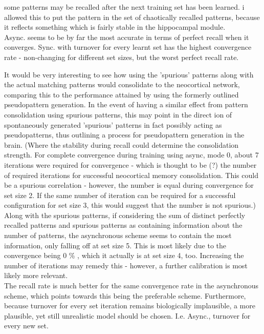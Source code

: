 some patterns may be recalled after the next training set has been learned. i allowed this to put the pattern in the set of chaotically recalled patterns, because it reflects something which is fairly stable in the hippocampal module.
\\

Async. seems to be by far the most accurate in terms of perfect recall when it converges. Sync. with turnover for every learnt set has the highest convergence rate - non-changing for different set sizes, but the worst perfect recall rate.

It would be very interesting to see how using the 'spurious' patterns along with the actual matching patterns would consolidate to the neocortical network, comparing this to the performance attained by using the formerly outlined pseudopattern generation. In the event of having a similar effect from pattern consolidation using spurious patterns, this may point in the direct
ion of spontaneously generated 'spurious' patterns in fact possibly acting as pseudopatterns, thus outlining a process for pseudopattern generation in the brain. (Where the stability during recall could determine the consolidation strength. For complete convergence during training using async, mode 0, about 7 iterations were required for convergence - which is thought to be (?) the number of required iterations for successful neocortical memory consolidation. This could be a spurious correlation - however, the number is equal during convergence for set size 2. If the same number of iteration can be required for a successful configuration for set size 3, this would suggest that the number is not spurious.)
\\

Along with the spurious patterns, if considering the sum of distinct perfectly recalled patterns and spurious patterns as containing information about the number of patterns, the asynchronous scheme seems to contain the most information, only falling off at set size 5. This is most likely due to the convergence being 0 \% , which it actually is at set size 4, too. Increasing the number of iterations may remedy this - however, a further calibration is most likely more relevant.
\\

The recall rate is much better for the same convergence rate in the asynchronous scheme, which points towards this being the preferable scheme. Furthermore, because turnover for every set iteration remains biologically implausible, a more plausible, yet still unrealistic model should be chosen. I.e. Async., turnover for every new set.

